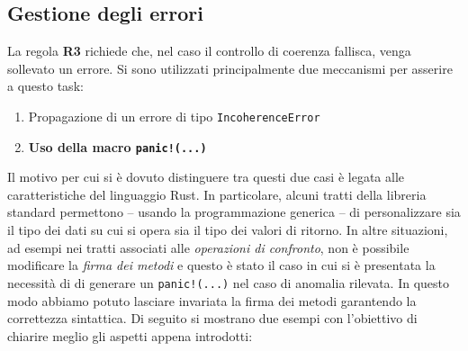 \subsection{Gestione degli errori}
La regola \textbf{R3} richiede che, nel caso il controllo di coerenza fallisca, venga sollevato un errore. Si sono utilizzati principalmente due meccanismi per asserire a questo task:
\begin{enumerate}
    \item Propagazione di un errore di tipo \texttt{IncoherenceError} 
    \item \textbf{Uso della macro \texttt{panic!(...)}}
\end{enumerate}
Il motivo per cui si è dovuto distinguere tra questi due casi è legata alle caratteristiche del linguaggio Rust. In particolare, alcuni tratti della libreria standard permettono -- usando la programmazione generica -- di personalizzare sia il tipo dei dati su cui si opera sia il tipo dei valori di ritorno. In altre situazioni, ad esempi nei tratti associati alle \textit{operazioni di confronto}, non è possibile modificare la \textit{firma dei metodi} e questo è stato il caso in cui si è presentata la necessità di di generare un \texttt{panic!(...)} nel caso di anomalia rilevata. In questo modo abbiamo potuto lasciare invariata la firma dei metodi garantendo la correttezza sintattica.
Di seguito si mostrano due esempi con l'obiettivo di chiarire meglio gli aspetti appena introdotti:
 

